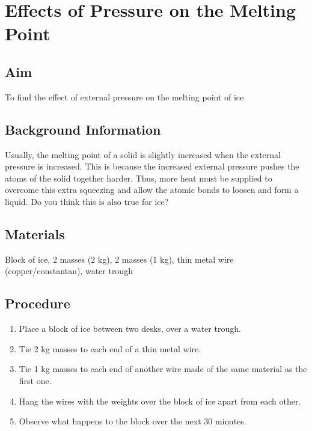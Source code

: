 \chapter{Effects of Pressure on the Melting Point}

\section{Aim}
To find the effect of external pressure on the melting point of ice

\section{Background Information}
Usually, the melting point of a solid is slightly increased when the external pressure is increased. This is because the increased external pressure pushes the atoms of the solid together harder. Thus, more heat must be supplied to overcome this extra squeezing and allow the atomic bonds to loosen and form a liquid. Do you think this is also true for ice?  

\section{Materials}
Block of ice, 2 masses (2 kg), 2 masses (1 kg), thin metal wire (copper\slash constantan), water trough

\section{Procedure}
\begin{enumerate}
\item Place a block of ice between two desks, over a water trough.
\item Tie 2 kg masses to each end of a thin metal wire.
\item Tie 1 kg masses to each end of another wire made of the same material as the first one.
\item Hang the wires with the weights over the block of ice apart from each other. 
\item Observe what happens to the block over the next 30 minutes.
\end{enumerate}


